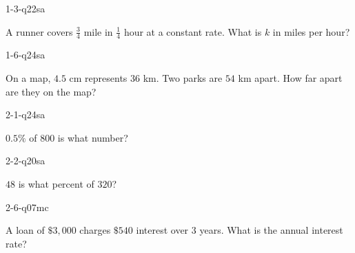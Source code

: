 
\begin{practiceQuestion}{1-3-q22}{sa}
\begin{questionText}
A runner covers $\frac{3}{4}$ mile in $\frac{1}{4}$ hour at a constant rate. What is $k$ in miles per hour?
\end{questionText}
\end{practiceQuestion}

\begin{practiceQuestion}{1-6-q24}{sa}
\begin{questionText}
On a map, $4.5$ cm represents $36$ km. Two parks are $54$ km apart. How far apart are they on the map?
\end{questionText}
\end{practiceQuestion}

\begin{practiceQuestion}{2-1-q24}{sa}
\begin{questionText}
$0.5\%$ of $800$ is what number?
\end{questionText}
\end{practiceQuestion}

\begin{practiceQuestion}{2-2-q20}{sa}
\begin{questionText}
$48$ is what percent of $320$?
\end{questionText}
\end{practiceQuestion}

\begin{practiceQuestion}{2-6-q07}{mc}
\begin{questionText}
A loan of $\$3{,}000$ charges $\$540$ interest over $3$ years. What is the annual interest rate?
\end{questionText}
\end{practiceQuestion}

